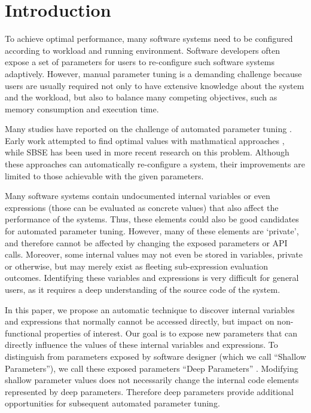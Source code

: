 
\section{Introduction}

To achieve optimal performance, many software systems need to be configured according to workload and running environment. 
Software developers often expose a set of parameters for users to re-configure such software systems adaptively.
However, manual parameter tuning is a demanding challenge because users are usually required not only to have extensive knowledge about the system and the workload, but also to balance many competing objectives, such as memory consumption and execution time.

Many studies have reported on the challenge of automated parameter tuning \cite{Hoffmann:2011:DKR:1950365.1950390, Vuduc01statisticalmodels,autotuning,Whaley:1998:ATL:509058.509096,Tapus:2002:AHT:762761.762771, hutter2009paramils,arcuri-ssbse-2011}. Early work attempted to find optimal values with mathmatical approaches \cite{Vuduc01statisticalmodels,autotuning,Whaley:1998:ATL:509058.509096,Tapus:2002:AHT:762761.762771}, while SBSE \cite{Harman:2007:CSF:1253532.1254729} has been used in more recent research \cite{hutter2009paramils,arcuri-ssbse-2011, Hoffmann:2011:DKR:1950365.1950390} on this problem. Although these approaches can automatically re-configure a system, their improvements are limited to those achievable with the given parameters.


Many software systems contain undocumented internal variables or even expressions (those can be evaluated as concrete values) that also affect the performance of the systems. Thus, these elements could also be good candidates for automated parameter tuning. However, many of these elements are `private', and therefore cannot be affected by changing the exposed parameters or API calls. Moreover, some internal values may not even be stored in variables, private or otherwise, but may merely exist as fleeting sub-expression evaluation outcomes. Identifying these variables and expressions is very difficult for general users, as it requires a deep understanding of the source code of the system. 


In this paper, we propose an automatic technique to discover internal variables and expressions that normally cannot be accessed directly, but impact on non-functional properties of interest. Our goal is to expose new parameters that can directly influence the values of these internal variables and expressions. To distinguish from parameters exposed by software designer (which we call ``Shallow Parameters''), we call these exposed parameters ``Deep Parameters'' \cite{Harman:2014:GIA:2593929.2600116}. Modifying shallow parameter values does not necessarily change the internal code elements represented by deep parameters. Therefore deep parameters provide additional opportunities for subsequent automated parameter tuning.


